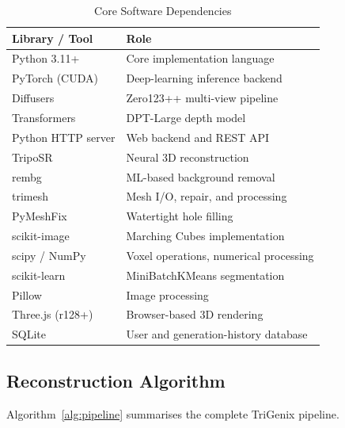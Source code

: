 ﻿\documentclass[conference]{IEEEtran}
\begin{document}
\begin{table}[htbp]
\caption{Core Software Dependencies}
\label{tab:software}
\centering
\begin{tabular}{ll}
\toprule
\textbf{Library / Tool} & \textbf{Role} \\
\midrule
Python 3.11+     & Core implementation language \\
PyTorch (CUDA)   & Deep-learning inference backend \\
Diffusers        & Zero123++ multi-view pipeline \\
Transformers     & DPT-Large depth model \\
Python HTTP server  & Web backend and REST API \\
TripoSR          & Neural 3D reconstruction \\
rembg            & ML-based background removal \\
trimesh          & Mesh I/O, repair, and processing \\
PyMeshFix        & Watertight hole filling \\
scikit-image     & Marching Cubes implementation \\
scipy / NumPy    & Voxel operations, numerical processing \\
scikit-learn     & MiniBatchKMeans segmentation \\
Pillow           & Image processing \\
Three.js (r128+) & Browser-based 3D rendering \\
SQLite           & User and generation-history database \\
\bottomrule
\end{tabular}
\end{table}

\subsection{Reconstruction Algorithm}

Algorithm~\ref{alg:pipeline} summarises the complete TriGenix pipeline.
\end{document}
